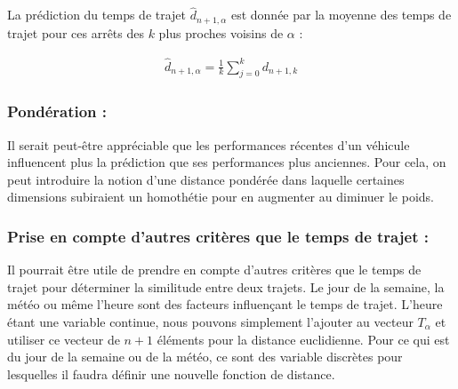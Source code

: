 \documentclass[letterpaper]{article}
\begin{document}
La prédiction du temps de trajet $\hat{d}_{n+1,\alpha}$ est donnée par la moyenne des temps de trajet pour ces arrêts des $k$ plus proches voisins de $\alpha$ :

\begin{eqnarray}
\hat{d}_{n+1,\alpha} = \frac{1}{k} \sum_{j=0}^{k}d_{n+1,k}
\end{eqnarray}

\subsubsection{Pondération :}
Il serait peut-être appréciable que les performances récentes d'un véhicule influencent plus la prédiction que ses performances plus anciennes. Pour cela, on peut introduire la notion d'une distance pondérée dans laquelle certaines dimensions subiraient un homothétie pour en augmenter au diminuer le poids.

\subsubsection{Prise en compte d'autres critères que le temps de trajet :}
Il pourrait être utile de prendre en compte d'autres critères que le temps de trajet pour déterminer la similitude entre deux trajets.
Le jour de la semaine, la météo ou même l'heure sont des facteurs influençant le temps de trajet.
L'heure étant une variable continue, nous pouvons simplement l'ajouter au vecteur $T_{\alpha}$ et utiliser ce vecteur de $n+1$ éléments pour la distance euclidienne. Pour ce qui est du jour de la semaine ou de la météo, ce sont des variable discrètes pour lesquelles il faudra définir une nouvelle fonction de distance.

\footnotesize


\end{document}
